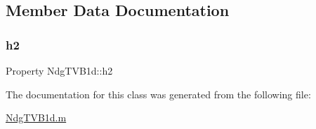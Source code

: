 \subsection{Member Data Documentation}
\mbox{\label{class_ndg_t_v_b1d_a86f4d0b07304796a18fbb5861f4f7227}} 
\subsubsection{\texorpdfstring{h2}{h2}}
{\footnotesize\ttfamily Property Ndg\+T\+V\+B1d\+::h2}



The documentation for this class was generated from the following file\+:\begin{DoxyCompactItemize}
\item 
\hyperlink{_ndg_t_v_b1d_8m}{Ndg\+T\+V\+B1d.\+m}\end{DoxyCompactItemize}
